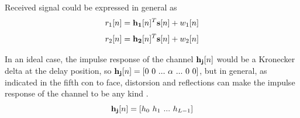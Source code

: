   Received signal could be expressed in general as
  \begin{dmath}
    r_1[n] = \vect{h_1}[n]^T \vect{s}[n] + w_1[n]
  \end{dmath}
  \begin{dmath}
    r_2[n] = \vect{h_2}[n]^T \vect{s}[n] + w_2[n]
  \end{dmath}
  
  In an ideal case, the impulse response of the channel $\mathbf{h_j}[n]$ would be a Kronecker delta at the delay position, so $\vect{h_j}[n] = [0\ 0\ ...\ \alpha\ ...\ 0\ 0]$, but in general, as indicated in the fifth con to face, distorsion and reflections can make the impulse response of the channel to be any kind \cite{overview}.
  \begin{dmath}
    \vect{h_j}[n] = [h_0\ h_1\ ...\ h_{L-1}]
  \end{dmath}
  
